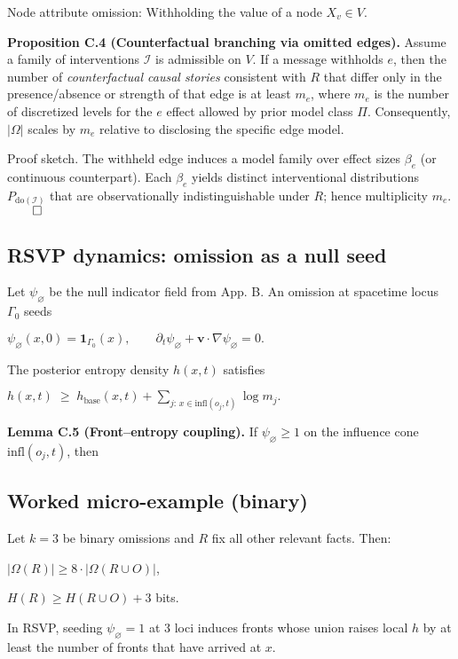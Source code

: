 \documentclass[12pt,a4paper]{article}
\begin{document}
Node attribute omission: Withholding the value of a node $X_v \in V$.

\textbf{Proposition C.4 (Counterfactual branching via omitted edges).} Assume a family of interventions $\mathcal{I}$ is admissible on $V$. If a message withholds $e$, then the number of \emph{counterfactual causal stories} consistent with $R$ that differ only in the presence/absence or strength of that edge is at least $m_e$, where $m_e$ is the number of discretized levels for the $e$ effect allowed by prior model class $\Pi$. Consequently, $|\Omega|$ scales by $m_e$ relative to disclosing the specific edge model.

Proof sketch. The withheld edge induces a model family over effect sizes $\beta_e$ (or continuous counterpart). Each $\beta_e$ yields distinct interventional distributions $P_{\mathrm{do}(\mathcal{I})}$ that are observationally indistinguishable under $R$; hence multiplicity $m_e$. $\qed$

\subsection{RSVP dynamics: omission as a null seed}

Let $\psi_{\varnothing}$ be the null indicator field from App. B. An omission at spacetime locus $\Gamma_0$ seeds

$\psi_{\varnothing}(x,0)=\mathbf{1}_{\Gamma_0}(x),\qquad
\partial_t \psi_{\varnothing}+\mathbf v\cdot\nabla \psi_{\varnothing}=0 .$

The posterior entropy density $h(x,t)$ satisfies

$h(x,t)\;\ge\; h_{\text{base}}(x,t)+\sum_{j:\,x\in\mathrm{infl}(o_j,t)} \log m_j .$

\textbf{Lemma C.5 (Front–entropy coupling).} If $\psi_{\varnothing} \geq 1$ on the influence cone $\mathrm{infl}(o_j,t)$, then

\subsection{Worked micro-example (binary)}

Let $k=3$ be binary omissions and $R$ fix all other relevant facts. Then:

$|\Omega(R)| \geq 8 \cdot |\Omega(R \cup O)|$,

$H(R) \geq H(R \cup O) + 3$ bits.

In RSVP, seeding $\psi_{\varnothing}=1$ at 3 loci induces fronts whose union raises local $h$ by at least the number of fronts that have arrived at $x$.
\end{document}
